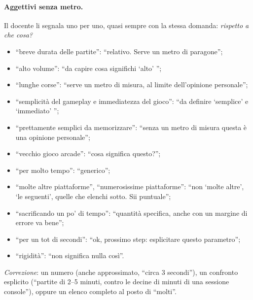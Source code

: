 \paragraph{Aggettivi senza metro.} Il docente li segnala uno per uno, quasi
sempre con la stessa domanda: \emph{rispetto a che cosa?}
\begin{itemize}
  \item ``breve durata delle partite'': ``relativo. Serve un metro di
        paragone'';
  \item ``alto volume'': ``da capire cosa significhi `alto' '';
  \item ``lunghe corse'': ``serve un metro di misura, al limite
        dell'opinione personale'';
  \item ``semplicità del gameplay e immediatezza del gioco'': ``da definire
        `semplice' e `immediato' '';
  \item ``prettamente semplici da memorizzare'': ``senza un metro di misura
        questa è una opinione personale'';
  \item ``vecchio gioco arcade'': ``cosa significa questo?'';
  \item ``per molto tempo'': ``generico'';
  \item ``molte altre piattaforme'', ``numerosissime piattaforme'': ``non
        `molte altre', `le seguenti', quelle che elenchi sotto. Sii
        puntuale'';
  \item ``sacrificando un po' di tempo'': ``quantità specifica, anche con un
        margine di errore va bene'';
  \item ``per un tot di secondi'': ``ok, prossimo step: esplicitare questo
        parametro'';
  \item ``rigidità'': ``non significa nulla così''.
\end{itemize}
\emph{Correzione}: un numero (anche approssimato, ``circa 3 secondi''), un
confronto esplicito (``partite di 2--5 minuti, contro le decine di minuti di
una sessione console''), oppure un elenco completo al posto di
``molti''.

